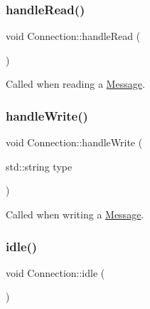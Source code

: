 \mbox{\label{classConnection_af084bfb2043337222d885cc8cc46201d}} 
\subsubsection{\texorpdfstring{handle\+Read()}{handleRead()}}
{\footnotesize\ttfamily void Connection\+::handle\+Read (\begin{DoxyParamCaption}{ }\end{DoxyParamCaption})\hspace{0.3cm}{\ttfamily [private]}}



Called when reading a \mbox{\hyperlink{classMessage}{Message}}. 

\mbox{\label{classConnection_a0b08401c5769b84c2a2b4b99363925fa}} 
\subsubsection{\texorpdfstring{handle\+Write()}{handleWrite()}}
{\footnotesize\ttfamily void Connection\+::handle\+Write (\begin{DoxyParamCaption}\item[{std\+::string}]{type }\end{DoxyParamCaption})\hspace{0.3cm}{\ttfamily [private]}}



Called when writing a \mbox{\hyperlink{classMessage}{Message}}. 

\mbox{\label{classConnection_a4f79c85d33fd0a9e640405ec665cc01d}} 
\subsubsection{\texorpdfstring{idle()}{idle()}}
{\footnotesize\ttfamily void Connection\+::idle (\begin{DoxyParamCaption}{ }\end{DoxyParamCaption})}




